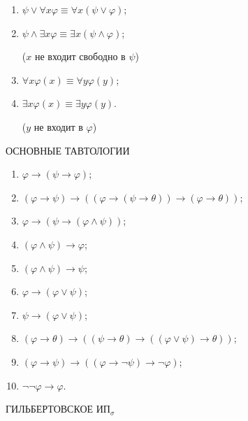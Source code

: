 \documentclass[a4paper,11pt]{article}
\begin{document}
\begin{enumerate}
\item $\psi \lor \forall x \varphi\equiv \forall x (\psi\lor
\varphi)$; 

\item $\psi \land\exists x \varphi \equiv\exists x (\psi \land \varphi)$;

($x$  не входит свободно в $\psi$)

\item $\forall x \varphi(x) \equiv\forall y \varphi(y)$; 

\item $\exists
x\varphi(x) \equiv \exists y\varphi(y)$.

($y$ не входит в $\varphi$)
\end{enumerate}

\pagebreak

ОСНОВНЫЕ ТАВТОЛОГИИ
\medskip

\begin{enumerate}
\item $\varphi\rightarrow(\psi\rightarrow\varphi)$; 

\item $(\varphi\rightarrow\psi) \rightarrow ((\varphi\rightarrow (\psi
\rightarrow \theta))\rightarrow
(\varphi \rightarrow\theta))$;
\medskip

\item $\varphi \rightarrow (\psi\rightarrow (\varphi \land \psi))$;

\item $(\varphi
\land \psi)\rightarrow \varphi$;

\item $(\varphi \land \psi) \rightarrow\psi$; 
\medskip

\item $\varphi
\rightarrow
(\varphi \lor \psi)$;

\item $\psi \rightarrow (\varphi \lor \psi)$;

\item $(\varphi
\rightarrow \theta) \rightarrow ((\psi \rightarrow \theta)
\rightarrow ((\varphi \lor \psi) \rightarrow
\theta))$;
\medskip

\item $(\varphi \rightarrow \psi) \rightarrow ((\varphi \rightarrow
\neg\psi) \rightarrow \neg\varphi)$; 

\item $\neg\neg\varphi\rightarrow \varphi$.
\end{enumerate}
\pagebreak


ГИЛЬБЕРТОВСКОЕ  ИП$_\sigma$
\end{document}
